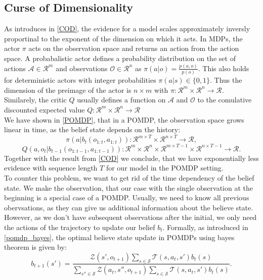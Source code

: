 \subsection{Curse of Dimensionality}
\label{COD_AC}
As introduces in \ref{COD}, the evidence for a model scales approximately inversly proportinal to the exponent of the dimension on which it acts. In MDPs, the 
actor $\pi$ acts on the observation space and returns an action from the action space. A probabalistic actor defines a probability distribution on the set 
of actions $\mathcal{A} \in \mathcal{R}^m$ and observations $\mathcal{O} \in \mathcal{R}^n$ as $\pi(a|o) = \frac{p(a,o)}{p(o)}$. This also holds for 
deterministic actors with integer probabilities $\pi(a|s) \in \{0,1\}$.
Thus the dimension of the preimage of the actor is $n \times m$ with $\pi:\mathcal{R}^m \times \mathcal{R}^n \rightarrow \mathcal{R}$.\\
Similarely, the critic $Q$ usually defines a function on $\mathcal{A}$ and $\mathcal{O}$ to the comulative discounted expected value 
$Q:\mathcal{R}^m \times \mathcal{R}^n \rightarrow \mathcal{R}$\\
We have shown in \ref{POMDP}, that in a POMDP, the observation space grows linear in time, as the belief state depends on the history: 
$$\pi(a| b_t(o_{1:t}, a_{1:t})):\mathcal{R}^{m \times T} \times \mathcal{R}^{n \times T} \rightarrow \mathcal{R},$$
$$Q(a, o_{t}| b_{t-1}(o_{1:t-1}, a_{1:t-1})):\mathcal{R}^{m} \times \mathcal{R}^{n} \times \mathcal{R}^{m \times T-1} \times \mathcal{R}^{n \times T-1} \rightarrow \mathcal{R}.$$
Together with the result from \ref{COD} we conclude, that we have 
exponentially less evidence with sequence length $T$ for our model in the POMDP setting.\\
To counter this problem, we want to get rid of the time dependency of the belief state. 
We make the observation, that our case with the single observation at the beginning is a special case of a POMDP. Usually, 
we need to know all previous obervsations, as they can give us additional information about the believe state. However, as we don't have subsequent observations 
after the initial, we only need the actions of the trajectory to update our belief $b_t$. Formally, as introduced in \ref{pomdp_bayes}, the optimal believe state 
update in POMDPs using bayes theorem is given by:
\begin{equation}
    b_{t+1}(s') = \frac{\mathcal{Z}(s', o_{t+1}) \sum_{s \in \mathcal{S}} \mathcal{T}(s, a_t, s') b_t(s)}{\sum_{s'' \in \mathcal{S}} \mathcal{Z}(a_t, s'', o_{t+1}) \sum_{s \in \mathcal{S}} \mathcal{T}(s, a_t, s') b_t(s)}.
\end{equation}
